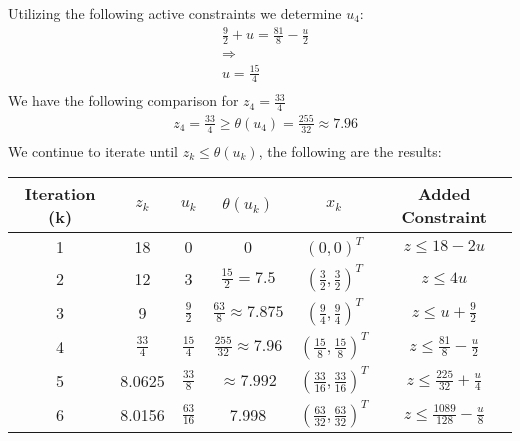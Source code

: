 \documentclass[12pt]{article}
\begin{document}
    Utilizing the following active constraints we determine $u_4$:\\
        \begin{align*}
            &\frac{9}{2} + u = \frac{81}{8} - \frac{u}{2}\\
            &\Rightarrow\\
            &u = \frac{15}{4}\\
        \end{align*}
    We have the following comparison for $z_4 = \frac{33}{4}$\\
        \begin{align*}
            &z_4 = \frac{33}{4} \geq \theta (u_4) = \frac{255}{32} \approx 7.96\\
        \end{align*}
    We continue to iterate until $z_k \leq \theta(u_k)$, the following are the results:
        \begin{table}[]
            \begin{tabular}{@{}cccccc@{}}
            \toprule
            Iteration  (k) & $z_k$          & $u_k$           & $\theta(u_k)$                 & $x_k$                              & Added Constraint                      \\ \midrule
            1              & 18           & 0             & 0                           & $(0,0)^T$                          & $z \leq 18-2u$       \\
            2              & 12           & 3             & $\frac{15}{2} = 7.5 $      & $(\frac{3}{2}, \frac{3}{2})^T$     & $z \leq 4u$        \\
            3              & 9            & $\frac{9}{2}$   & $\frac{63}{8} \approx 7.875$  & $(\frac{9}{4}, \frac{9}{4})^T$     & $z \leq u + \frac{9}{2}$   \\
            4              & $\frac{33}{4}$ & $\frac{15}{4}$  & $\frac{255}{32} \approx 7.96$ & $(\frac{15}{8}, \frac{15}{8})^T$   & $z \leq \frac{81}{8} - \frac{u}{2}$ \\
            5              & 8.0625       & $\frac{33}{8}$  & $\approx 7.992$              & $(\frac{33}{16}, \frac{33}{16})^T$ & $z \leq \frac{225}{32} + \frac{u}{4}$   \\
            6              & 8.0156       & $\frac{63}{16}$ & 7.998                       & $(\frac{63}{32}, \frac{63}{32})^T$ & $z \leq \frac{1089}{128} - \frac{u}{8}$ \\ \bottomrule
            \end{tabular}
        \end{table}        
\end{document}
